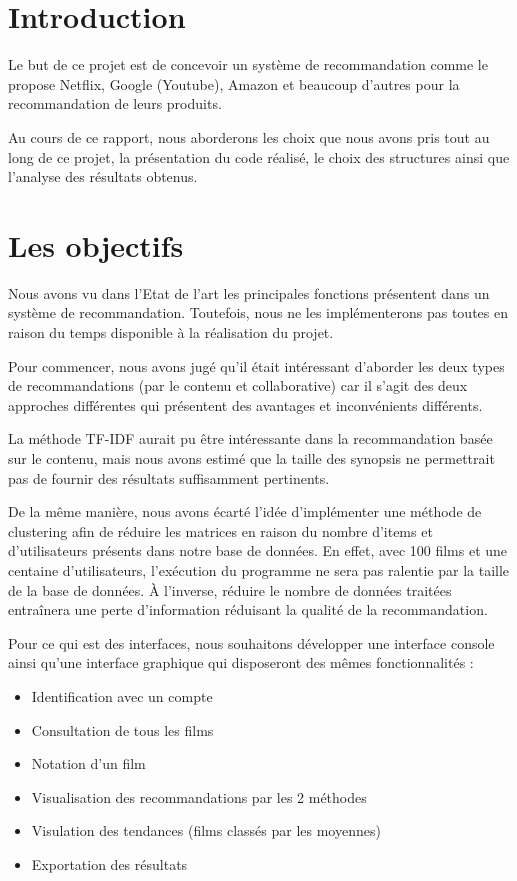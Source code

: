 \documentclass[11pt,a4paper]{report}
\begin{document}
\section{Introduction}

Le but de ce projet est de concevoir un système de recommandation comme le propose Netflix, Google (Youtube), Amazon et beaucoup d'autres pour la recommandation de leurs produits.\par
Au cours de ce rapport, nous aborderons les choix que nous avons pris tout au long de ce projet, la présentation du code réalisé, le choix des structures ainsi que l'analyse des résultats obtenus.

\section{Les objectifs}

Nous avons vu dans l'Etat de l'art les principales fonctions présentent dans un système de recommandation. Toutefois, nous ne les implémenterons pas toutes en raison du temps disponible à la réalisation du projet.\par
Pour commencer, nous avons jugé qu'il était intéressant d'aborder les deux types de recommandations (par le contenu et collaborative) car il s'agit des deux approches différentes qui présentent des avantages et inconvénients différents.\par
La méthode TF-IDF aurait pu être intéressante dans la recommandation basée sur le contenu, mais nous avons estimé que la taille des synopsis ne permettrait pas de fournir des résultats suffisamment pertinents.\par
De la même manière, nous avons écarté l'idée d'implémenter une méthode de clustering afin de réduire les matrices en raison du nombre d'items et d'utilisateurs présents dans notre base de données. En effet, avec 100 films et une centaine d'utilisateurs, l'exécution du programme ne sera pas ralentie par la taille de la base de données. À l'inverse, réduire le nombre de données traitées entraînera une perte d'information réduisant la qualité de la recommandation.\par
\vspace{0.5cm}
Pour ce qui est des interfaces, nous souhaitons développer une interface console ainsi qu'une interface graphique qui disposeront des mêmes fonctionnalités :
\begin{itemize}
	\item Identification avec un compte
	\item Consultation de tous les films
	\item Notation d'un film
	\item Visualisation des recommandations par les 2 méthodes
	\item Visulation des tendances (films classés par les moyennes)
	\item Exportation des résultats
\end{itemize}
\end{document}
